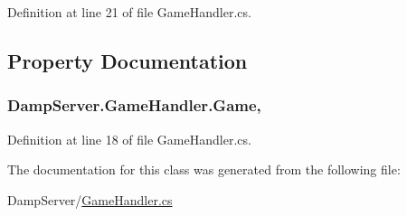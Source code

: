 Definition at line 21 of file Game\-Handler.\-cs.



\subsection{Property Documentation}
\hypertarget{class_damp_server_1_1_game_handler_ab35a15438022b146c719e7b00f653ada}{
\subsubsection[{Game}]{ Damp\-Server.\-Game\-Handler.\-Game\hspace{0.3cm}{\ttfamily [get]}, {\ttfamily [set]}}}\label{class_damp_server_1_1_game_handler_ab35a15438022b146c719e7b00f653ada}


Definition at line 18 of file Game\-Handler.\-cs.



The documentation for this class was generated from the following file\-:\begin{DoxyCompactItemize}
\item 
Damp\-Server/\hyperlink{_game_handler_8cs}{Game\-Handler.\-cs}\end{DoxyCompactItemize}
